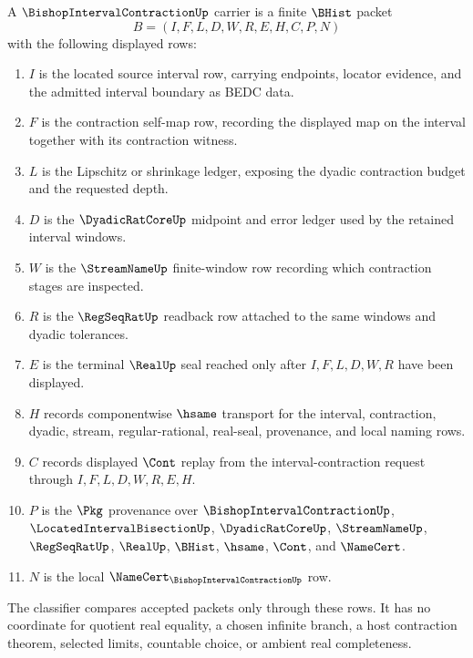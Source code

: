 \begin{definition}
\label{def:bishop-interval-contraction-carrier}
A $\BishopIntervalContractionUp$ carrier is a finite $\BHist$ packet
$$
B=(I,F,L,D,W,R,E,H,C,P,N)
$$
with the following displayed rows:
\begin{enumerate}
\item $I$ is the located source interval row, carrying endpoints, locator evidence, and the admitted interval boundary as BEDC data.
\item $F$ is the contraction self-map row, recording the displayed map on the interval together with its contraction witness.
\item $L$ is the Lipschitz or shrinkage ledger, exposing the dyadic contraction budget and the requested depth.
\item $D$ is the $\DyadicRatCoreUp$ midpoint and error ledger used by the retained interval windows.
\item $W$ is the $\StreamNameUp$ finite-window row recording which contraction stages are inspected.
\item $R$ is the $\RegSeqRatUp$ readback row attached to the same windows and dyadic tolerances.
\item $E$ is the terminal $\RealUp$ seal reached only after $I,F,L,D,W,R$ have been displayed.
\item $H$ records componentwise $\hsame$ transport for the interval, contraction, dyadic, stream, regular-rational, real-seal, provenance, and local naming rows.
\item $C$ records displayed $\Cont$ replay from the interval-contraction request through $I,F,L,D,W,R,E,H$.
\item $P$ is the $\Pkg$ provenance over $\BishopIntervalContractionUp$, $\LocatedIntervalBisectionUp$, $\DyadicRatCoreUp$, $\StreamNameUp$, $\RegSeqRatUp$, $\RealUp$, $\BHist$, $\hsame$, $\Cont$, and $\NameCert$.
\item $N$ is the local $\NameCert_{\BishopIntervalContractionUp}$ row.
\end{enumerate}
The classifier compares accepted packets only through these rows. It has no coordinate for quotient real equality, a chosen infinite branch, a host contraction theorem, selected limits, countable choice, or ambient real completeness.
\end{definition}

